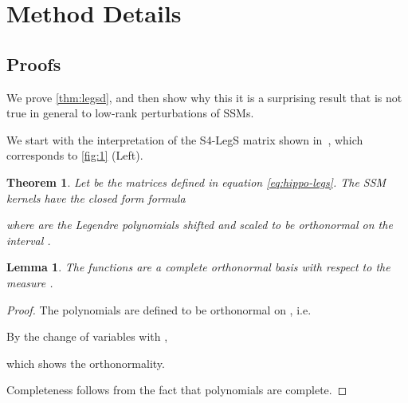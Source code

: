 \documentclass{article}
\newtheorem{theorem}{Theorem}
\newtheorem{lemma}{Lemma}[section]
\begin{document}
\newpage


\newpage

\appendix

 \section{Method Details}
\label{sec:theory-details}










\subsection{Proofs}
\label{sec:theory-details:proofs}

We prove \cref{thm:legsd}, and then show why this it is a surprising result that is not true in general to low-rank perturbations of SSMs.

We start with the interpretation of the S4-LegS matrix shown in~\citep{gu2022hippo},
which corresponds to \cref{fig:1} (Left).

\begin{theorem}\label{thm:legs}
  Let  be the matrices defined in equation \eqref{eq:hippo-legs}.
  The SSM kernels  have the closed form formula
  
  where  are the Legendre polynomials shifted and scaled to be orthonormal on the interval .
\end{theorem}



\begin{lemma}\label{lmm:legs-orthonormal}
  The functions  are a complete orthonormal basis with respect to the measure .
\end{lemma}
\begin{proof}The polynomials are defined to be orthonormal on , i.e.
  
  By the change of variables  with ,
  
  which shows the orthonormality.

  Completeness follows from the fact that polynomials are complete.
\end{proof}
\end{document}
